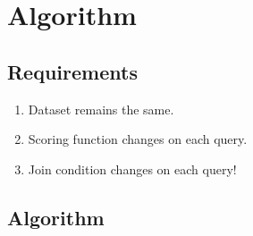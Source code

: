
\section{Algorithm}
\label{sec:algorithm}

\subsection{Requirements}

\begin{enumerate}
  \item Dataset remains the same.
  \item Scoring function changes on each query.
  \item Join condition changes on each query!
\end{enumerate}

\subsection{Algorithm}

